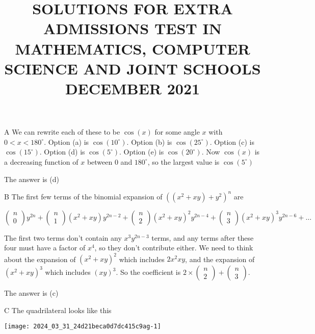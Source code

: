 \documentclass[10pt]{article}
\title{SOLUTIONS FOR EXTRA ADMISSIONS TEST IN MATHEMATICS, COMPUTER SCIENCE AND JOINT SCHOOLS DECEMBER 2021 }
\author{}
\date{}
\begin{document}
\maketitle
A We can rewrite each of these to be $\cos (x)$ for some angle $x$ with $0<x<180^{\circ}$. Option (a) is $\cos \left(10^{\circ}\right)$. Option (b) is $\cos \left(25^{\circ}\right)$. Option (c) is $\cos \left(15^{\circ}\right)$. Option (d) is $\cos \left(5^{\circ}\right)$. Option (e) is $\cos \left(20^{\circ}\right)$. Now $\cos (x)$ is a decreasing function of $x$ between 0 and $180^{\circ}$, so the largest value is $\cos \left(5^{\circ}\right)$

The answer is (d)

B The first few terms of the binomial expansion of $\left(\left(x^{2}+x y\right)+y^{2}\right)^{n}$ are

$$
\left(\begin{array}{l}
n \\
0
\end{array}\right) y^{2 n}+\left(\begin{array}{l}
n \\
1
\end{array}\right)\left(x^{2}+x y\right) y^{2 n-2}+\left(\begin{array}{l}
n \\
2
\end{array}\right)\left(x^{2}+x y\right)^{2} y^{2 n-4}+\left(\begin{array}{l}
n \\
3
\end{array}\right)\left(x^{2}+x y\right)^{3} y^{2 n-6}+\ldots
$$

The first two terms don't contain any $x^{3} y^{2 n-3}$ terms, and any terms after these four must have a factor of $x^{4}$, so they don't contribute either. We need to think about the expansion of $\left(x^{2}+x y\right)^{2}$ which includes $2 x^{2} x y$, and the expansion of $\left(x^{2}+x y\right)^{3}$ which includes $(x y)^{3}$. So the coefficient is $2 \times\left(\begin{array}{l}n \\ 2\end{array}\right)+\left(\begin{array}{l}n \\ 3\end{array}\right)$.

The answer is (c)

C The quadrilateral looks like this

\begin{center}
\texttt{[image: 2024\_03\_31\_24d21beca0d7dc415c9ag-1]}
\end{center}
\end{document}
